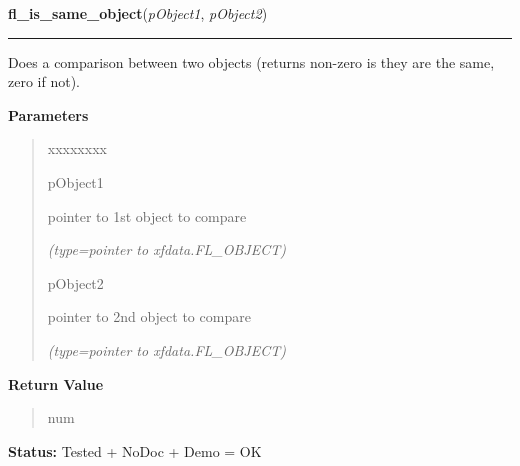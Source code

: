     \label{xformslib:library:fl_is_same_object}

    \vspace{0.5ex}

\hspace{.8\funcindent}\begin{boxedminipage}{\funcwidth}

    \raggedright \textbf{fl\_is\_same\_object}(\textit{pObject1}, \textit{pObject2})

    \vspace{-1.5ex}

    \rule{\textwidth}{0.5\fboxrule}
\setlength{\parskip}{2ex}
    Does a comparison between two objects (returns non-zero is they are the
    same, zero if not).

\setlength{\parskip}{1ex}
      \textbf{Parameters}
      \vspace{-1ex}

      \begin{quote}
        \begin{Ventry}{xxxxxxxx}

          \item[pObject1]

          pointer to 1st object to compare

            {\it (type=pointer to xfdata.FL\_OBJECT)}

          \item[pObject2]

          pointer to 2nd object to compare

            {\it (type=pointer to xfdata.FL\_OBJECT)}

        \end{Ventry}

      \end{quote}

      \textbf{Return Value}
    \vspace{-1ex}

      \begin{quote}
      num

      \end{quote}

\textbf{Status:} Tested + NoDoc + Demo = OK



    \end{boxedminipage}

